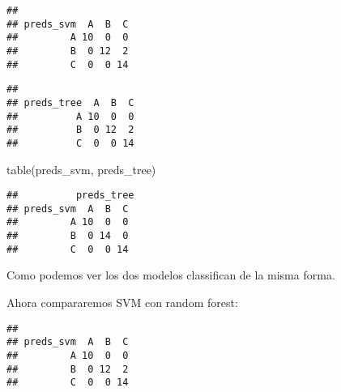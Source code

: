 \documentclass[]{article}
\newenvironment{Shaded}{\begin{snugshade}}{\end{snugshade}}
\newcommand{\KeywordTok}[1]{\textcolor[rgb]{0.94,0.87,0.69}{#1}}
\newcommand{\OperatorTok}[1]{\textcolor[rgb]{0.94,0.94,0.82}{#1}}
\newcommand{\NormalTok}[1]{\textcolor[rgb]{0.80,0.80,0.80}{#1}}
\begin{document}
\begin{verbatim}
##          
## preds_svm  A  B  C
##         A 10  0  0
##         B  0 12  2
##         C  0  0 14
\end{verbatim}

\begin{Shaded}
\end{Shaded}

\begin{verbatim}
##           
## preds_tree  A  B  C
##          A 10  0  0
##          B  0 12  2
##          C  0  0 14
\end{verbatim}

\begin{Shaded}
\begin{Highlighting}[]
\KeywordTok{table}\NormalTok{(preds_svm, preds_tree)}
\end{Highlighting}
\end{Shaded}

\begin{verbatim}
##          preds_tree
## preds_svm  A  B  C
##         A 10  0  0
##         B  0 14  0
##         C  0  0 14
\end{verbatim}

Como podemos ver los dos modelos classifican de la misma forma.

Ahora compararemos SVM con random forest:

\begin{Shaded}
\end{Shaded}

\begin{verbatim}
##          
## preds_svm  A  B  C
##         A 10  0  0
##         B  0 12  2
##         C  0  0 14
\end{verbatim}

\begin{Shaded}
\end{Shaded}
\end{document}
